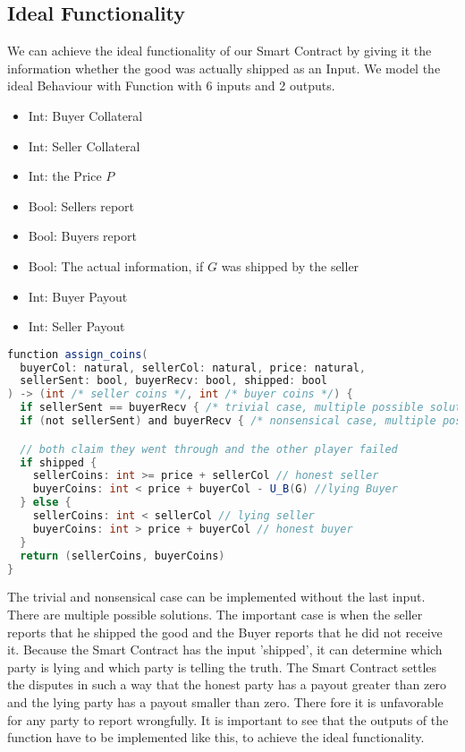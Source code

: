 \documentclass{cacthesis}
\begin{document}
\subsection{Ideal Functionality}
We can achieve the ideal functionality of our Smart Contract by giving it the information whether the good was actually shipped as an Input. We model the ideal Behaviour with Function with 6 inputs and 2 outputs.

\begin{itemize}
\item{Int: Buyer Collateral}
\item{Int: Seller Collateral}
\item{Int: the Price $P$}
\item{Bool: Sellers report}
\item{Bool: Buyers report}
\item{Bool: The actual information, if $G$ was shipped by the seller}
\end{itemize}

\begin{itemize}
\item{Int: Buyer Payout}
\item{Int: Seller Payout}
\end{itemize}


\begin{lstlisting}[language=java]
function assign_coins(
  buyerCol: natural, sellerCol: natural, price: natural,
  sellerSent: bool, buyerRecv: bool, shipped: bool
) -> (int /* seller coins */, int /* buyer coins */) {
  if sellerSent == buyerRecv { /* trivial case, multiple possible solutions  */ }
  if (not sellerSent) and buyerRecv { /* nonsensical case, multiple possible solutions */ }

  // both claim they went through and the other player failed
  if shipped {
    sellerCoins: int >= price + sellerCol // honest seller
    buyerCoins: int < price + buyerCol - U_B(G) //lying Buyer
  } else {
    sellerCoins: int < sellerCol // lying seller
    buyerCoins: int > price + buyerCol // honest buyer
  }
  return (sellerCoins, buyerCoins)
}
\end{lstlisting}
The trivial and nonsensical case can be implemented without the last input. There are multiple possible solutions.\newline
The important case is when the seller reports that he shipped the good and the Buyer reports that he did not receive it. Because the Smart Contract has the input 'shipped', it can determine which party is lying and which party is telling the truth.\newline
The Smart Contract settles the disputes in such a way that the honest party has a payout greater than zero and the lying party has a payout smaller than zero. There fore it is unfavorable for any party to report wrongfully.\newline
It is important to see that the outputs of the function have to be implemented like this, to achieve the ideal functionality.\newline
\end{document}
